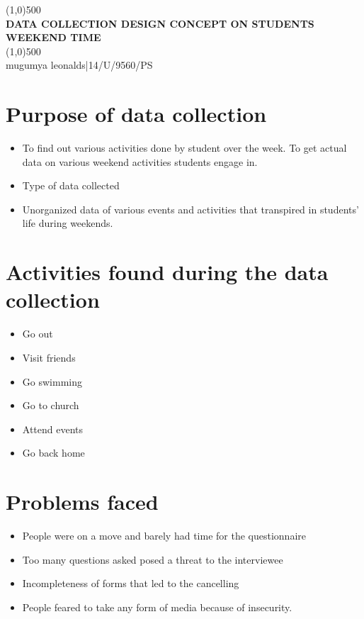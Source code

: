 \documentclass[12pt,a4paper]{article}
\begin{document}
\begin{titlepage}
    \begin{center}
\line(1,0){500}\\
\huge{\bfseries DATA COLLECTION DESIGN CONCEPT ON STUDENTS WEEKEND TIME\\}
\line(1,0){500}\\
[0.25in]
mugumya leonalds|14/U/9560/PS\\
\end{center}
\end{titlepage}

\section{Purpose of data collection}
\begin{itemize}
\item To find out various activities done by student over the week. To get actual data on various weekend activities students engage in.
\item Type of data collected
\item Unorganized data of various events and activities that transpired in students’ life during weekends.
\end{itemize}

\section{Activities found during the data collection}
\begin{itemize}
\item Go out
\item Visit friends
\item Go swimming
\item Go to church
\item Attend events
\item Go back home
\end{itemize}
\section{Problems faced}
\begin{itemize}
\item People were on a move and barely had time for the questionnaire
\item Too many questions asked posed a threat to the interviewee
\item Incompleteness of forms that led to the cancelling
\item People feared to take any form of media because of insecurity.
\end{itemize}
\end{document}
